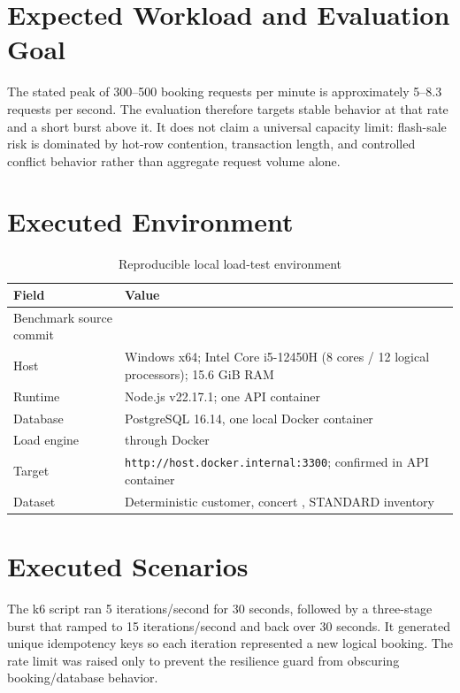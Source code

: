 \section{Expected Workload and Evaluation Goal}
The stated peak of 300--500 booking requests per minute is approximately
5--8.3 requests per second. The evaluation therefore targets stable behavior
at that rate and a short burst above it. It does not claim a universal capacity
limit: flash-sale risk is dominated by hot-row contention, transaction length,
and controlled conflict behavior rather than aggregate request volume alone.

\section{Executed Environment}
\begingroup
\setlength{\tabcolsep}{4pt}
\begin{table}[H]
\centering
\caption{Reproducible local load-test environment}
\begin{tabularx}{\textwidth}{p{}Y}
\toprule
\textbf{Field} & \textbf{Value} \\
\midrule
Benchmark source commit &  \\
Host & Windows x64; Intel Core i5-12450H (8 cores / 12 logical processors); 15.6 GiB RAM \\
Runtime & Node.js v22.17.1; one API container \\
Database & PostgreSQL 16.14, one local Docker container \\
Load engine &  through Docker \\
Target & \nolinkurl{http://host.docker.internal:3300};  confirmed in API container \\
Dataset & Deterministic customer, concert , STANDARD inventory \\
\bottomrule
\end{tabularx}
\end{table}
\endgroup

\section{Executed Scenarios}
The k6 script ran 5 iterations/second for 30 seconds, followed by a three-stage
burst that ramped to 15 iterations/second and back over 30 seconds. It generated
unique idempotency keys so each iteration represented a new logical booking.
The rate limit was raised only to prevent the resilience guard from obscuring
booking/database behavior.

